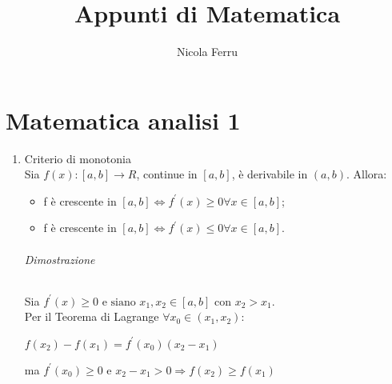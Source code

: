 \documentclass{book}
\title{Appunti di Matematica}
\author{Nicola Ferru}
\date{}
\begin{document}
\maketitle
\tableofcontents
\listoftables
\listoffigures



\part{Matematica analisi 1}



\begin{enumerate}
	\item Criterio di monotonia\\
		Sia $f(x):[a,b]\to R$, continue in $[a,b]$, è derivabile in $(a,b)$.
		Allora:
		\begin{itemize}
			\item f è crescente in $[a,b]\Leftrightarrow f^\prime(x)\geq 0
				\forall x \in [a,b]$;
			\item f è crescente in $[a,b]\Leftrightarrow f^\prime(x)\leq 0
				\forall x \in [a,b]$.
		\end{itemize}
		\paragraph{Dimostrazione}
		Sia $f^\prime (x)\geq 0 \text{ e siano } x_1,x_2\in[a,b]\text{ con }
		x_2>x_1$.\\
		Per il Teorema di Lagrange $\forall x_0\in (x_1,x_2)$:	
			\begin{center}
				$f(x_2)-f(x_1)=f^\prime(x_0)(x_2-x_1)$
			\end{center}
			ma $f^\prime(x_0)\geq 0$ e $x_2-x_1>0 \Rightarrow f(x_2)\geq f(x_1)$

\end{enumerate}
\end{document}
